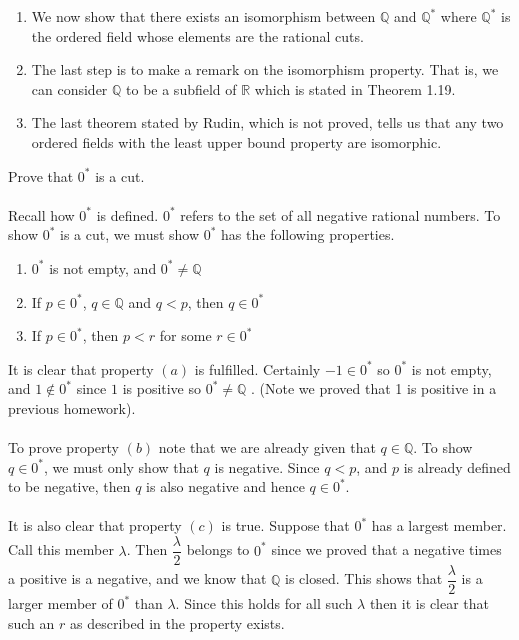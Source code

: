 \documentclass[12pt]{article}
\begin{document}
\begin{enumerate}
\item We now show that there exists an isomorphism between $\mathbb{Q}$ and $\mathbb{Q^{*}}$ where $\mathbb{Q^{*}}$ is the ordered field whose elements are the rational cuts.
\item The last step is to make a remark on the isomorphism property. That is, we can consider $\mathbb{Q}$ to be a subfield of $\mathbb{R}$ which is stated in Theorem 1.19. 
\item The last theorem stated by Rudin, which is not proved, tells us that any two ordered fields with the least upper bound property are isomorphic. 
\end{enumerate} 

\problem 
Prove that $0^{*}$ is a cut. \\ \\
Recall how $0^{*}$ is defined. $0^{*}$ refers to the set of all negative rational numbers. To show $0^{*}$ is a cut, we must show $0^{*}$ has the following properties.
\begin{enumerate}
\item $0^{*}$ is not empty, and $0^{*} \neq \mathbb{Q}$
\item If $p \in 0^{*}$, $q \in \mathbb{Q}$ and $q<p$, then $q \in 0^{*}$
\item If $p \in 0^{*}$, then $p<r$ for some $r \in 0^{*}$
\end{enumerate}
It is clear that property $(a)$ is fulfilled. Certainly $-1 \in 0^{*}$ so $0^{*}$ is not empty, and $1 \notin 0^{*}$ since $1$ is positive so $0^{*} \neq \mathbb{Q}$ . (Note we proved that 1 is positive in a previous homework). \\ \\

\noindent To prove property $(b)$ note that we are already given that $q \in \mathbb{Q}$. To show $q \in 0^{*}$, we must only show that $q$ is negative. Since $q<p$, and $p$ is already defined to be negative, then $q$ is also negative and hence $q \in 0^{*}$. \\ \\

\noindent It is also clear that property $(c)$ is true. Suppose that $0^{*}$ has a largest member. Call this member $\lambda$. Then $\dfrac{\lambda}{2}$ belongs to $0^{*}$ since we proved that a negative times a positive is a negative, and we know that $\mathbb{Q}$ is closed. This shows that $\dfrac{\lambda}{2}$ is a larger member of $0^{*}$ than $\lambda$. Since this holds for all such $\lambda$ then it is clear that such an $r$ as described in the property exists. \\ \\
\end{document}
